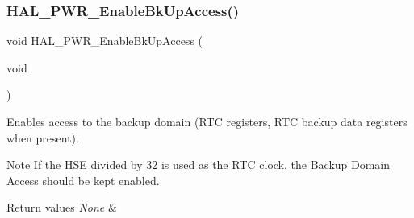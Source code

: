 \subsubsection{\texorpdfstring{H\+A\+L\+\_\+\+P\+W\+R\+\_\+\+Enable\+Bk\+Up\+Access()}{HAL\_PWR\_EnableBkUpAccess()}}
{\footnotesize\ttfamily void H\+A\+L\+\_\+\+P\+W\+R\+\_\+\+Enable\+Bk\+Up\+Access (\begin{DoxyParamCaption}\item[{void}]{ }\end{DoxyParamCaption})}



Enables access to the backup domain (R\+TC registers, R\+TC backup data registers when present). 

\begin{DoxyNote}{Note}
If the H\+SE divided by 32 is used as the R\+TC clock, the Backup Domain Access should be kept enabled. 
\end{DoxyNote}

\begin{DoxyRetVals}{Return values}
{\em None} & \\
\hline
\end{DoxyRetVals}
